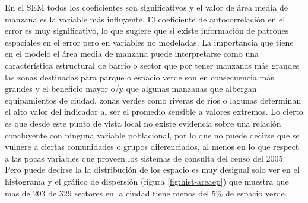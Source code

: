\documentclass[12pt,]{book}
\begin{document}
En el SEM todos los coeficientes son significativos y el valor de área
media de manzana es la variable más influyente. El coeficiente de
autocorrelación en el error es muy significativo, lo que sugiere que si
existe información de patrones espaciales en el error pero en variables
no modeladas. La importancia que tiene en el modelo el área media de
manzana puede interpretarse como una característica estructural de
barrio o sector que por tener manzanas más grandes las zonas destinadas
para parque o espacio verde son en consecuencia más grandes y el
beneficio mayor o/y que algunas manzanas que albergan equipamientos de
ciudad, zonas verdes como riveras de ríos o lagunas determinan el alto
valor del indicador al ser el promedio sensible a valores extremos. Lo
cierto es que desde este punto de vista local no existe evidencia sobre
una relación concluyente con ninguna variable poblacional, por lo que no
puede decirse que se vulnere a ciertas comunidades o grupos
diferenciados, al menos en lo que respect a las pocas variables que
proveen los sistemas de consulta del censo del 2005. Pero puede decirse
la la distribución de los espacio es muy desigual solo ver en el
histograma y el gráfico de dispersión (figura \ref{fig:hist-areaep}) que
muestra que mas de 203 de 329 sectores en la ciudad tiene menos del 5\%
de espacio verde.
\end{document}
